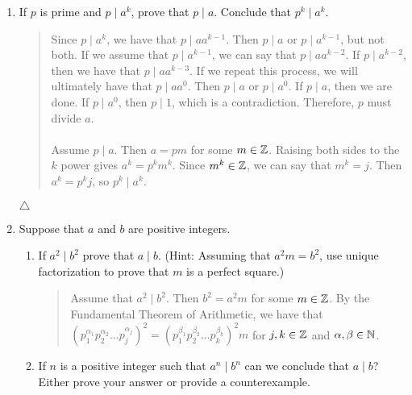 \documentclass{hw}
\begin{document}

\begin{enumerate}
\item If $p$ is prime and $p\mid a^k$, prove that $p\mid a$. Conclude that $p^k\mid a^k$.
\begin{quote}
Since $p\mid a^k$, we have that $p\mid aa^{k-1}$. Then $p\mid a$ or $p\mid a^{k-1}$, but not
both. If we assume that $p\mid a^{k-1}$, we can say that $p\mid aa^{k-2}$. If $p\mid a^{k-2}$, then we have
that $p\mid aa^{k-3}$. If we repeat this process, we will ultimately have that $p\mid aa^0$. Then $p\mid a$
or $p\mid a^0$. If $p\mid a$, then we are done. If $p\mid a^0$, then $p\mid 1$, which
is a contradiction. Therefore, $p$ must divide $a$.\\\\
Assume $p\mid a$. Then $a=pm$ for some $m\in\mathbb{Z}$. Raising both sides to the $k$ power gives $a^k=p^km^k$.
Since $m^k\in\mathbb{Z}$, we can say that $m^k=j$. Then $a^k=p^kj$, so $p^k\mid a^k$.
\end{quote}
$\triangle$



\item Suppose that $a$ and $b$ are positive integers.
\begin{enumerate}
\item If $a^2\mid b^2$ prove that $a\mid b$. (Hint: Assuming that $a^2m = b^2$, use unique factorization to
prove that $m$ is a perfect square.)
\begin{quote}
Assume that $a^2\mid b^2$. Then $b^2=a^2m$ for some $m\in\mathbb{Z}$. By the Fundamental Theorem of Arithmetic,
we have that
$(p_{1}^{\alpha_1}p_{2}^{\alpha_2}\dots p_{j}^{\alpha_j})^2 =
(p_{1}^{\beta_1}p_{2}^{\beta_2}\dots p_{k}^{\beta_k})^2m$ for $j,k\in\mathbb{Z}$ and $\alpha,\beta\in\mathbb{N}$.
\end{quote}

\item If $n$ is a positive integer such that $a^n \mid b^n$ can we conclude that $a \mid b$? Either prove
your answer or provide a counterexample.
\begin{quote}

\end{quote}
\end{enumerate}




\end{enumerate}
\end{document}
